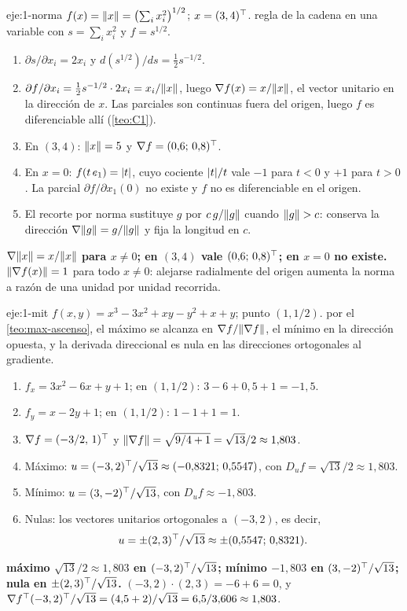 \begin{solucion}{eje:1-norma}
\datos $f(x)=\lVert x\rVert=\bigl(\sum_ix_i^{2}\bigr)^{1/2}$; $x=(3,4)^{\top}$.
\planteamiento regla de la cadena en una variable con $s=\sum_ix_i^{2}$ y $f=s^{1/2}$.
\pasos
\begin{enumerate}[label=\arabic*.]
  \item $\partial s/\partial x_i=2x_i$ y $d(s^{1/2})/ds=\tfrac12 s^{-1/2}$.
  \item $\partial f/\partial x_i=\tfrac12 s^{-1/2}\cdot 2x_i=x_i/\lVert x\rVert$, luego $\nabla f(x)=x/\lVert x\rVert$, el vector unitario en la dirección de $x$. Las parciales son continuas fuera del origen, luego $f$ es diferenciable allí (\cref{teo:C1}).
  \item En $(3,4)$: $\lVert x\rVert=5$ y $\nabla f=(0{,}6;\,0{,}8)^{\top}$.
  \item En $x=0$: $f(t\,e_1)=\lvert t\rvert$, cuyo cociente $\lvert t\rvert/t$ vale $-1$ para $t<0$ y $+1$ para $t>0$. La parcial $\partial f/\partial x_1(0)$ no existe y $f$ no es diferenciable en el origen.
  \item El recorte por norma sustituye $g$ por $c\,g/\lVert g\rVert$ cuando $\lVert g\rVert>c$: conserva la dirección $\nabla\lVert g\rVert=g/\lVert g\rVert$ y fija la longitud en $c$.
\end{enumerate}
\resultado \textbf{$\nabla\lVert x\rVert=x/\lVert x\rVert$ para $x\ne 0$; en $(3,4)$ vale $(0{,}6;\,0{,}8)^{\top}$; en $x=0$ no existe.}
\comprobacion $\lVert\nabla f(x)\rVert=1$ para todo $x\ne 0$: alejarse radialmente del origen aumenta la norma a razón de una unidad por unidad recorrida.
\end{solucion}

\begin{solucion}{eje:1-mit}
\datos $f(x,y)=x^{3}-3x^{2}+xy-y^{2}+x+y$; punto $(1,1/2)$.
\planteamiento por el \cref{teo:max-ascenso}, el máximo se alcanza en $\nabla f/\lVert\nabla f\rVert$, el mínimo en la dirección opuesta, y la derivada direccional es nula en las direcciones ortogonales al gradiente.
\pasos
\begin{enumerate}[label=\arabic*.]
  \item $f_x=3x^{2}-6x+y+1$; en $(1,1/2)$: $3-6+0{,}5+1=-1{,}5$.
  \item $f_y=x-2y+1$; en $(1,1/2)$: $1-1+1=1$.
  \item $\nabla f=(-3/2,\,1)^{\top}$ y $\lVert\nabla f\rVert=\sqrt{9/4+1}=\sqrt{13}/2\approx 1{,}803$.
  \item Máximo: $u=(-3,2)^{\top}/\sqrt{13}\approx(-0{,}8321;\,0{,}5547)$, con $D_uf=\sqrt{13}/2\approx 1{,}803$.
  \item Mínimo: $u=(3,-2)^{\top}/\sqrt{13}$, con $D_uf\approx-1{,}803$.
  \item Nulas: los vectores unitarios ortogonales a $(-3,2)$, es decir,
  \[u=\pm(2,3)^{\top}/\sqrt{13}\approx\pm(0{,}5547;\,0{,}8321).\]
\end{enumerate}
\resultado \textbf{máximo $\sqrt{13}/2\approx 1{,}803$ en $(-3,2)^{\top}/\sqrt{13}$; mínimo $-1{,}803$ en $(3,-2)^{\top}/\sqrt{13}$; nula en $\pm(2,3)^{\top}/\sqrt{13}$.}
\comprobacion $(-3,2)\cdot(2,3)=-6+6=0$, y $\nabla f^{\top}(-3,2)^{\top}/\sqrt{13}=(4{,}5+2)/\sqrt{13}=6{,}5/3{,}606\approx 1{,}803$.
\end{solucion}

